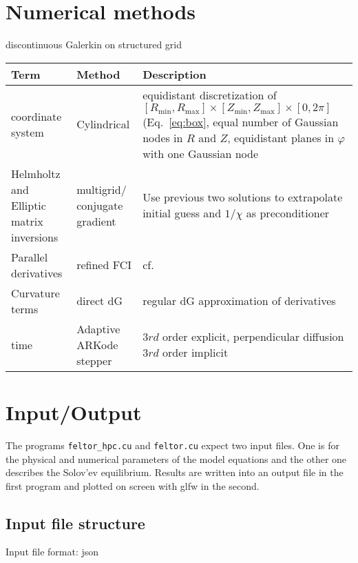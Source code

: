\section{Numerical methods}
discontinuous Galerkin on structured grid
\begin{longtable}{p{3cm}l>{\RaggedRight}p{7cm}}
\toprule
\rowcolor{gray!50}\textbf{Term} &  \textbf{Method} & \textbf{Description}  \\ \midrule
    coordinate system & Cylindrical & equidistant discretization of $[R_{\min},R_{\max}] \times [Z_{\min},Z_{\max}] \times [0,2\pi]$ (Eq.~\eqref{eq:box}, equal number of Gaussian nodes in $R$ and $Z$, equidistant planes in $\varphi$ with one Gaussian node \\
Helmholtz and Elliptic matrix inversions & multigrid/ conjugate gradient & Use previous two solutions to extrapolate initial guess and $1/\chi$ as preconditioner \\
Parallel derivatives & refined  FCI & cf.~\cite{Held2016,Stegmeir2017} \\
Curvature terms & direct dG & regular dG approximation of derivatives \\
time & Adaptive ARKode stepper & $3rd$ order explicit, perpendicular diffusion $3rd$ order implicit \\
\bottomrule
\end{longtable}
\section{Input/Output}
The programs \texttt{feltor\_hpc.cu} and \texttt{feltor.cu} expect two input
files. One is for the physical and numerical parameters of the model equations
and the other one describes the Solov'ev equilibrium. Results are written into
an output file in the first program and plotted on screen with glfw in the
second.

\subsection{Input file structure}
Input file format: json

